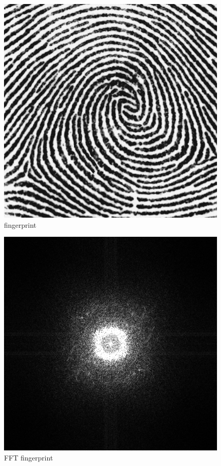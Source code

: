 \documentclass{article}
\begin{document}
\begin{figure}
	\begin{center}
		\includegraphics[scale=0.4]{fingerprint}\\
		fingerprint
	\end{center}
\end{figure}
\begin{figure}
	\begin{center}
		\includegraphics[scale=0.4]{fingerprint_FFT}\\
		FFT fingerprint
	\end{center}
\end{figure}
\end{document}
